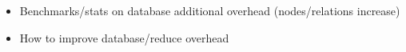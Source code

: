 \todo
\begin{itemize}
	\item Benchmarks/stats on database
		\subitem additional overhead (nodes/relations increase)
	\item How to improve database/reduce overhead
\end{itemize}